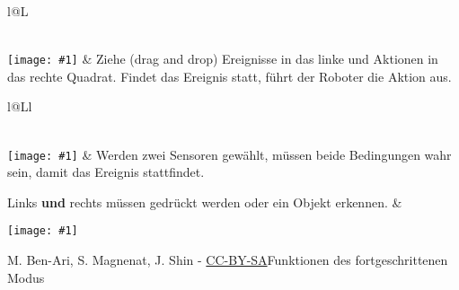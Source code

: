 \documentclass[a4paper]{article}
\newcommand*{\blk}[1]{\raisebox{-40pt}%
{\texttt{[image: \#1]}}}
\newcommand*{\blkbig}[1]{\raisebox{-50pt}%
{\texttt{[image: \#1]}}}
\begin{document}
\vfill

\begin{tabularx}{\textwidth}{l@{\hspace{.7cm}}L}

 \\[.4cm]


\blkbig{empty-frame} & Ziehe (drag and drop) Ereignisse in das linke und Aktionen in das rechte Quadrat. Findet das Ereignis statt, führt der Roboter die Aktion aus.
\\

\end{tabularx}

\vfill

\begin{tabularx}{\textwidth}{l@{\hspace{.7cm}}Ll}

 \\[.4cm]

\blk{sensor-and-button} & Werden zwei Sensoren gewählt, müssen beide Bedingungen wahr sein, damit das Ereignis stattfindet.

Links \textbf{und} rechts müssen gedrückt werden oder ein Objekt erkennen. &

\blk{sensor-and-prox}\\

\end{tabularx}

\vfill

{\normalsize M. Ben-Ari, S. Magnenat, J. Shin - \href{http://creativecommons.org/licenses/by-sa/3.0/}{CC-BY-SA}}\hfill\colorbox{advancedmode}{Funktionen des fortgeschrittenen Modus}
\end{document}
